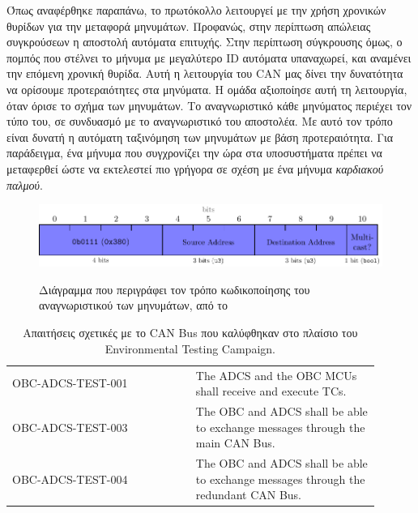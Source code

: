 \documentclass[a4paper,nobib,justified]{tufte-book}
\begin{document}
Όπως αναφέρθηκε παραπάνω, το πρωτόκολλο λειτουργεί με την χρήση χρονικών θυρίδων για την μεταφορά μηνυμάτων. Προφανώς, στην περίπτωση απώλειας συγκρούσεων η αποστολή αυτόματα επιτυχής. Στην περίπτωση σύγκρουσης όμως, ο πομπός που στέλνει το μήνυμα με μεγαλύτερο ID αυτόματα υπαναχωρεί, και αναμένει την επόμενη χρονική θυρίδα. Αυτή η λειτουργία του CAN μας δίνει την δυνατότητα να ορίσουμε προτεραιότητες στα μηνύματα. Η ομάδα αξιοποίησε αυτή τη λειτουργία, όταν όρισε το σχήμα των μηνυμάτων. Το αναγνωριστικό κάθε μηνύματος περιέχει τον τύπο του, σε συνδυασμό με το αναγνωριστικό του αποστολέα. Με αυτό τον τρόπο είναι δυνατή η αυτόματη ταξινόμηση των μηνυμάτων με βάση προτεραιότητα. Για παράδειγμα, ένα μήνυμα που συγχρονίζει την ώρα στα υποσυστήματα πρέπει να μεταφερθεί ώστε να εκτελεστεί πιο γρήγορα σε σχέση με ένα μήνυμα \textit{καρδιακού παλμού}.

\begin{figure}
	\centering
	\includegraphics[width=0.8\linewidth]{media/diagrams/tp-message-id.pdf}
	\label{fig:tp-message-id}
	\caption[Κωδικοποίηση του αναγνωριστικού ενός μηνύματος]{Διάγραμμα που περιγράφει τον τρόπο κωδικοποίησης του αναγνωριστικού των μηνυμάτων, από το }
\end{figure}

\begin{table}
    \centering
    \caption[Απαιτήσεις σχετικές με το CAN Bus]{Απαιτήσεις σχετικές με το CAN Bus που καλύφθηκαν στο πλαίσιο του Environmental Testing Campaign.}
    \begin{tabular}{|p{0.45\linewidth}|p{0.45\linewidth}|}
        \hline
        \rowcolor[HTML]{4F5054}
        \multicolumn{2}{|c|}{\color[HTML]{FFFFFF} Requirements} \\ \hline
        \rowcolor[HTML]{F0F0F1} OBC-ADCS-TEST-001 & The ADCS and the OBC MCUs shall receive and execute TCs. \\ \hline
        \rowcolor[HTML]{F0F0F1} OBC-ADCS-TEST-003 & The OBC and ADCS shall be able to exchange messages through the main CAN Bus. \\ \hline
        \rowcolor[HTML]{F0F0F1} OBC-ADCS-TEST-004 & The OBC and ADCS shall be able to exchange messages through the redundant CAN Bus. \\ \hline
    \end{tabular}
\end{table}
\end{document}
